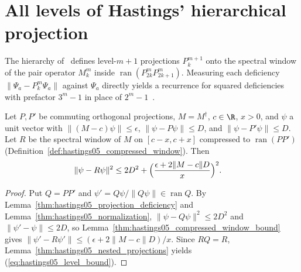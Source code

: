 \section{All levels of Hastings' hierarchical projection}
\label{sec:hastings05_hierarchy_levels}


The hierarchy of~\cite[lines 668--707]{Hastings2006Solving} defines level-$m+1$
projections $P_k^{m+1}$ onto the spectral window of the pair operator $M_k^m$
inside $\operatorname{ran}(P_{2k}^mP_{2k+1}^m)$. Measuring each deficiency
$\lVert\Psi_a-P_k^m\Psi_a\rVert$ against $\Psi_a$ directly yields a recurrence
for squared deficiencies with prefactor $3^m-1$ in place of
$2^m-1$~\cite{gap:hastings05_hierarchical_projection}.

\begin{lemma}
    \label{thm:hastings05_level_against_ground_state}
    \leanok
    Let $P,P'$ be commuting orthogonal projections, $M=M^\dagger$, $c\in\R$,
    $x>0$, and $\psi$ a unit vector with $\lVert(M-c)\psi\rVert\le\epsilon$,
    $\lVert\psi-P\psi\rVert\le D$, and $\lVert\psi-P'\psi\rVert\le D$. Let $R$
    be the spectral window of $M$ on $[c-x,c+x]$ compressed to
    $\operatorname{ran}(PP')$ (Definition~\ref{def:hastings05_compressed_window}).
    Then
    \begin{align}
        \lVert\psi-R\psi\rVert^2
         & \le2D^2+\Bigl(\frac{\epsilon+2\lVert M-c\rVert D}{x}\Bigr)^2 .
        \label{eq:hastings05_level_bound}
    \end{align}
\end{lemma}
\begin{proof}\leanok
    Put $Q=PP'$ and $\psi'=Q\psi/\lVert Q\psi\rVert\in\operatorname{ran}Q$.
    By Lemma~\ref{thm:hastings05_projection_deficiency} and
    Lemma~\ref{thm:hastings05_normalization},
    $\lVert\psi-Q\psi\rVert^2\le2D^2$ and $\lVert\psi'-\psi\rVert\le2D$, so
    Lemma~\ref{thm:hastings05_compressed_window_bound} gives
    $\lVert\psi'-R\psi'\rVert\le(\epsilon+2\lVert M-c\rVert D)/x$. Since
    $RQ=R$, Lemma~\ref{thm:hastings05_nested_projections} yields
    (\ref{eq:hastings05_level_bound}).
\end{proof}

